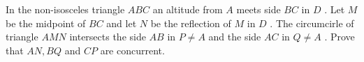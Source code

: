 In the non-isosceles triangle $ABC$ an altitude from $A$ meets side $BC$ in $D$ . Let $M$ be the midpoint of $BC$ and let $N$ be the reflection of $M$ in $D$ . The circumcirle of triangle $AMN$ intersects the side $AB$ in $P\ne A$ and the side $AC$ in $Q\ne A$ . Prove that $AN,BQ$ and $CP$ are concurrent.